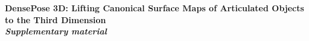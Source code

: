 \documentclass[10pt,twocolumn,letterpaper]{article}
\def\arxivsubmission{}
\begin{document}




%
\ifdefined\arxivsubmission%
\clearpage
\appendix
\setcounter{figure}{0} \renewcommand{\thefigure}{\Roman{figure}}
\setcounter{table}{0} \renewcommand{\thetable}{\Roman{table}}
\begin{strip}%
 \centering
 \Large
 \textbf{%
 DensePose 3D\@: Lifting Canonical Surface Maps of Articulated Objects to the Third Dimension\\
 \vspace{0.3cm} \textit{Supplementary material}
 }\\
\end{strip}

\fi

{\small}
\end{document}
